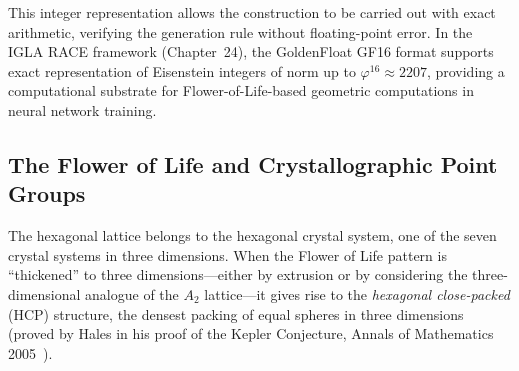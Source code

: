 \begin{center}
\end{center}

This integer representation allows the construction to be carried out
with exact arithmetic, verifying the generation rule without floating-point
error.  In the IGLA RACE framework (Chapter~24), the GoldenFloat GF16
format supports exact representation of Eisenstein integers of norm up to
\(\varphi^{16}\approx 2207\), providing a computational substrate for
Flower-of-Life-based geometric computations in neural network training.

\subsection{The Flower of Life and Crystallographic Point Groups}
\label{subsec:fol-crystal}

The hexagonal lattice belongs to the hexagonal crystal system, one of
the seven crystal systems in three dimensions.  When the Flower of Life
pattern is ``thickened'' to three dimensions—either by extrusion or by
considering the three-dimensional analogue of the \(A_2\) lattice—it
gives rise to the \emph{hexagonal close-packed} (HCP) structure, the
densest packing of equal spheres in three dimensions (proved by Hales
in his proof of the Kepler Conjecture, Annals of Mathematics 2005~\cite{hales_flyspeck}).

